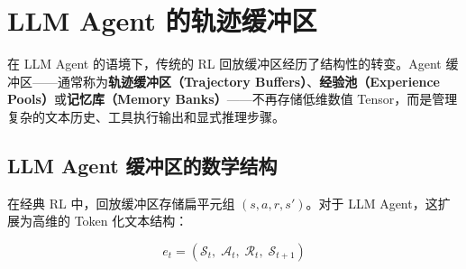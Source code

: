 \section{LLM Agent 的轨迹缓冲区}
\label{trajectory-buffers-for-llm-agents}

在 LLM Agent 的语境下，传统的 RL 回放缓冲区经历了结构性的转变。Agent 缓冲区——通常称为\textbf{轨迹缓冲区（Trajectory Buffers）}、\textbf{经验池（Experience Pools）}或\textbf{记忆库（Memory Banks）}——不再存储低维数值 Tensor，而是管理复杂的文本历史、工具执行输出和显式推理步骤。

\subsection{LLM Agent 缓冲区的数学结构}
\label{mathematical-structure-of-an-llm-agent-buffer}

在经典 RL 中，回放缓冲区存储扁平元组 $(s, a, r, s')$。对于 LLM Agent，这扩展为高维的 Token 化文本结构：

\begin{equation}
\boxed{e_t = \left( \mathcal{S}_t,\; \mathcal{A}_t,\; \mathcal{R}_t,\; \mathcal{S}_{t+1} \right)}
\end{equation}

